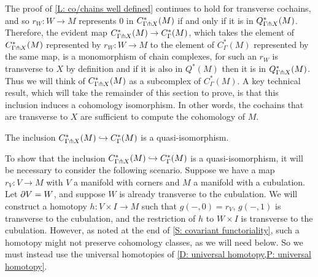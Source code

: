 The proof of \cref{L: co/chains well defined} continues to hold for transverse cochains, and so $r_W \colon W \to M$ represents $0$ in $C^*_{\Gamma \pitchfork X}(M)$ if and only if it is in $Q^*_{\Gamma \pitchfork X}(M)$.
Therefore, the evident map $C^*_{\Gamma \pitchfork X}(M) \to C^*_\Gamma(M)$, which takes the element of $C^*_{\Gamma \pitchfork X}(M)$ represented by $r_W \colon W \to M$ to the element of $C^*_\Gamma(M)$ represented by the same map, is a monomorphism of chain complexes, for such an $r_W$ is transverse to $X$ by definition and if it is also in $Q^*(M)$ then it is in $Q^*_{\Gamma \pitchfork X}(M)$.
Thus we will think of $C^*_{\Gamma \pitchfork X}(M)$ as a subcomplex of $C^*_\Gamma(M)$.
A key technical result, which will take the remainder of this section to prove,
is that this inclusion induces a cohomology isomorphism.
In other words, the cochains that are transverse to $X$ are sufficient to compute the cohomology of $M$.

\begin{theorem}\label{T: transverse complex}
	The inclusion $C^*_{\Gamma \pitchfork X}(M) \hookrightarrow C^*_\Gamma(M)$ is a quasi-isomorphism.
\end{theorem}

To show that the inclusion $C^*_{\Gamma \pitchfork X}(M) \hookrightarrow C^*_\Gamma(M)$ is a quasi-isomorphism, it will be necessary to consider the following scenario.
Suppose we have a map $r_V \colon V \to M$ with $V$ a manifold with corners and $M$ a manifold with a cubulation.
Let $\partial V = W$, and suppose $W$ is already transverse to the cubulation.
We will construct a homotopy $h \colon V \times I \to M$ such that $g(-,0) = r_V$, $g(-,1)$ is transverse to the cubulation, and the restriction of $h$ to $W \times I$ is transverse to the cubulation. However, as noted at the end of \cref{S: covariant functoriality}, such a homotopy might not preserve cohomology classes, as we will need below. So we must instead use the universal homotopies of \cref{D: universal homotopy,P: universal homotopy}.


